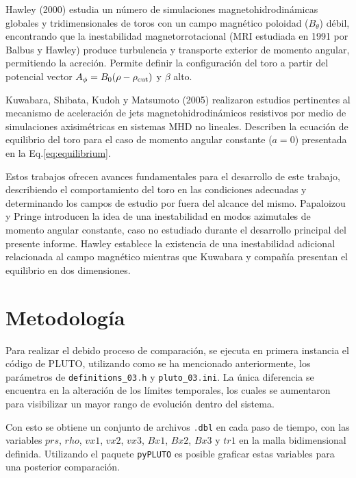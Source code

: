 \documentclass[11pt, letterpaper]{article}
\begin{document}
\medskip

Hawley (2000)\cite{Hawley} estudia un número de simulaciones magnetohidrodinámicas globales y tridimensionales de toros con un campo magnético poloidad ($B_\theta$) débil, encontrando que la inestabilidad magnetorrotacional (MRI estudiada en 1991 por Balbus y Hawley)\cite{HawleyMRI} produce turbulencia y transporte exterior de momento angular, permitiendo la acreción. Permite definir la configuración del toro a partir del potencial vector $A_\phi = B_0(\rho - \rho_{\rm cut})$ y $\beta$ alto.

\medskip

Kuwabara, Shibata, Kudoh y Matsumoto (2005)\cite{Kuwabara} realizaron estudios pertinentes al mecanismo de aceleración de jets magnetohidrodinámicos resistivos por medio de simulaciones axisimétricas en sistemas MHD no lineales. Describen la ecuación de equilibrio del toro para el caso de momento angular constante ($a = 0$) presentada en la Eq.\ref{eq:equilibrium}. 

\medskip

Estos trabajos ofrecen avances fundamentales para el desarrollo de este trabajo, describiendo el comportamiento del toro en las condiciones adecuadas y determinando los campos de estudio por fuera del alcance del mismo. Papaloizou y Pringe introducen la idea de una inestabilidad en modos azimutales de momento angular constante, caso no estudiado durante el desarrollo principal del presente informe. Hawley establece la existencia de una inestabilidad adicional relacionada al campo magnético mientras que Kuwabara y compañía presentan el equilibrio en dos dimensiones.

\section{Metodología}

Para realizar el debido proceso de comparación, se ejecuta en primera instancia el código de PLUTO, utilizando como se ha mencionado anteriormente, los parámetros de \lstinline[language=C]|definitions_03.h| y \lstinline[language=C]|pluto_03.ini|. La única diferencia se encuentra en la alteración de los límites temporales, los cuales se aumentaron para visibilizar un mayor rango de evolución dentro del sistema.

\medskip

Con esto se obtiene un conjunto de archivos \lstinline[language=C]|.dbl| en cada paso de tiempo, con las variables $prs$, $rho$, $vx1$, $vx2$, $vx3$, $Bx1$, $Bx2$, $Bx3$ y $tr1$ en la malla bidimensional definida. Utilizando el paquete \lstinline[language=C]|pyPLUTO| es posible graficar estas variables para una posterior comparación.
\end{document}
